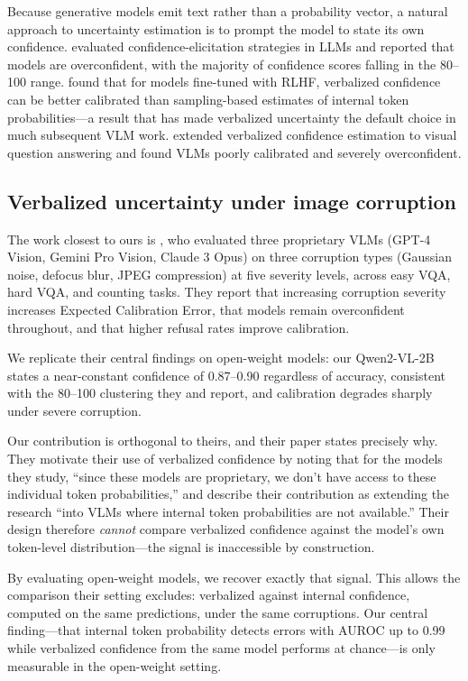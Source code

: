 \documentclass[11pt]{article}
\begin{document}
Because generative models emit text rather than a probability vector, a natural
approach to uncertainty estimation is to prompt the model to state its own
confidence. \citet{xiong2024} evaluated confidence-elicitation strategies in
LLMs and reported that models are overconfident, with the majority of confidence
scores falling in the 80--100 range. \citet{tian2023} found that for models
fine-tuned with RLHF, verbalized confidence can be better calibrated than
sampling-based estimates of internal token probabilities---a result that has
made verbalized uncertainty the default choice in much subsequent VLM work.
\citet{groot2024} extended verbalized confidence estimation to visual
question answering and found VLMs poorly calibrated and severely overconfident.

\subsection{Verbalized uncertainty under image corruption}

The work closest to ours is \citet{borszukovszki2025}, who evaluated three
proprietary VLMs (GPT-4 Vision, Gemini Pro Vision, Claude 3 Opus) on three
corruption types (Gaussian noise, defocus blur, JPEG compression) at five
severity levels, across easy VQA, hard VQA, and counting tasks. They report
that increasing corruption severity increases Expected Calibration Error, that
models remain overconfident throughout, and that higher refusal rates improve
calibration.

We replicate their central findings on open-weight models: our Qwen2-VL-2B
states a near-constant confidence of 0.87--0.90 regardless of accuracy,
consistent with the 80--100 clustering they and \citet{xiong2024} report, and
calibration degrades sharply under severe corruption.

Our contribution is orthogonal to theirs, and their paper states precisely why.
They motivate their use of verbalized confidence by noting that for the models
they study, ``since these models are proprietary, we don't have access to these
individual token probabilities,'' and describe their contribution as extending
the research ``into VLMs where internal token probabilities are not
available.'' Their design therefore \emph{cannot} compare verbalized confidence
against the model's own token-level distribution---the signal is inaccessible by
construction.

By evaluating open-weight models, we recover exactly that signal. This allows
the comparison their setting excludes: verbalized against internal confidence,
computed on the same predictions, under the same corruptions. Our central
finding---that internal token probability detects errors with AUROC up to 0.99
while verbalized confidence from the same model performs at chance---is only
measurable in the open-weight setting.
\end{document}
